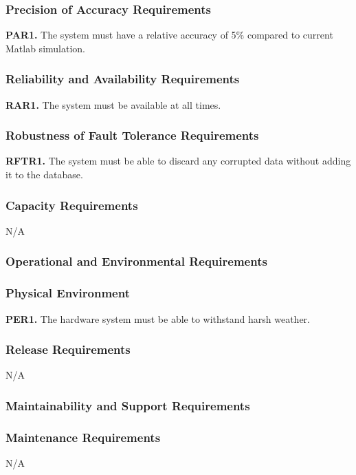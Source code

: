 \documentclass[12pt, titlepage]{article}
\begin{document}
\subsubsection{Precision of Accuracy Requirements}
\textbf{PAR1.} The system must have a relative accuracy of 5\% compared to current Matlab simulation.

\subsubsection{Reliability and Availability Requirements}
\textbf{RAR1.} The system must be available at all times.\\

\subsubsection{Robustness of Fault Tolerance Requirements}
\textbf{RFTR1.} The system must be able to discard any corrupted data without adding it to the database.\\

\subsubsection{Capacity Requirements}
N/A

\subsubsection{Operational and Environmental Requirements}
\subsubsection{Physical Environment}
\textbf{PER1.} The hardware system must be able to withstand harsh weather.

\subsubsection{Release Requirements}
N/A

\subsubsection{Maintainability and Support Requirements}
\subsubsection{Maintenance Requirements}
N/A
\end{document}
